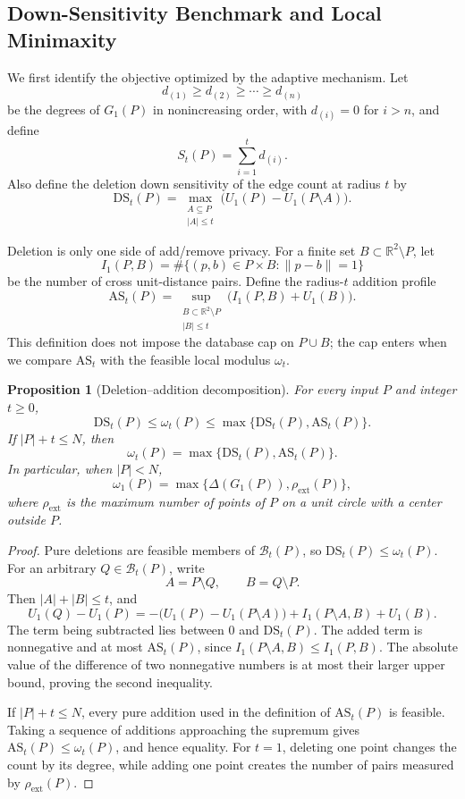 \documentclass[11pt]{article}
\newtheorem{proposition}[theorem]{Proposition}
\newcommand{\R}{\mathbb{R}}
\begin{document}
\subsection{Down-Sensitivity Benchmark and Local Minimaxity}
\label{sec:down-sensitivity}

We first identify the objective optimized by the adaptive mechanism. Let
\[
d_{(1)}\ge d_{(2)}\ge\cdots\ge d_{(n)}
\]
be the degrees of \(G_1(P)\) in nonincreasing order, with \(d_{(i)}=0\) for \(i>n\), and define
\[
S_t(P)=\sum_{i=1}^{t}d_{(i)}.
\]
Also define the deletion down sensitivity of the edge count at radius \(t\) by
\[
\mathrm{DS}_t(P)=
\max_{\substack{A\subseteq P\\ |A|\le t}}
\bigl(U_1(P)-U_1(P\setminus A)\bigr).
\]

Deletion is only one side of add/remove privacy. For a finite set \(B\subset\R^2\setminus P\), let
\[
I_1(P,B)=\#\{(p,b)\in P\times B:\|p-b\|=1\}
\]
be the number of cross unit-distance pairs. Define the radius-\(t\) addition profile
\[
\mathrm{AS}_t(P)=
\sup_{\substack{B\subset\R^2\setminus P\\ |B|\le t}}
\bigl(I_1(P,B)+U_1(B)\bigr).
\]
This definition does not impose the database cap on \(P\cup B\); the cap enters when we compare \(\mathrm{AS}_t\) with the feasible local modulus \(\omega_t\).

\begin{proposition}[Deletion--addition decomposition]
\label{prop:local-decomposition}
For every input \(P\) and integer \(t\ge0\),
\[
\mathrm{DS}_t(P)\le \omega_t(P)
\le \max\{\mathrm{DS}_t(P),\mathrm{AS}_t(P)\}.
\]
If \(|P|+t\le N\), then
\[
\omega_t(P)=\max\{\mathrm{DS}_t(P),\mathrm{AS}_t(P)\}.
\]
In particular, when \(|P|<N\),
\[
\omega_1(P)=\max\{\Delta(G_1(P)),\rho_{\mathrm{ext}}(P)\},
\]
where \(\rho_{\mathrm{ext}}\) is the maximum number of points of \(P\) on a unit circle with a center outside \(P\).
\end{proposition}

\begin{proof}
Pure deletions are feasible members of \(\mathcal B_t(P)\), so \(\mathrm{DS}_t(P)\le\omega_t(P)\). For an arbitrary \(Q\in\mathcal B_t(P)\), write
\[
A=P\setminus Q,
\qquad
B=Q\setminus P.
\]
Then \(|A|+|B|\le t\), and
\[
U_1(Q)-U_1(P)
=-\bigl(U_1(P)-U_1(P\setminus A)\bigr)
 +I_1(P\setminus A,B)+U_1(B).
\]
The term being subtracted lies between \(0\) and \(\mathrm{DS}_t(P)\). The added term is nonnegative and at most \(\mathrm{AS}_t(P)\), since \(I_1(P\setminus A,B)\le I_1(P,B)\). The absolute value of the difference of two nonnegative numbers is at most their larger upper bound, proving the second inequality.

If \(|P|+t\le N\), every pure addition used in the definition of \(\mathrm{AS}_t(P)\) is feasible. Taking a sequence of additions approaching the supremum gives \(\mathrm{AS}_t(P)\le\omega_t(P)\), and hence equality. For \(t=1\), deleting one point changes the count by its degree, while adding one point creates the number of pairs measured by \(\rho_{\mathrm{ext}}(P)\).
\end{proof}
\end{document}
